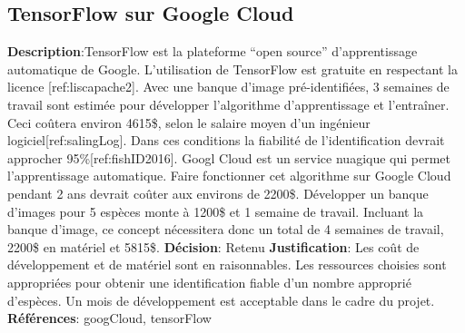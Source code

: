 

\subsection{TensorFlow sur Google Cloud}
\label{s:identifier_conc1}

\textbf{Description}:TensorFlow est la plateforme “open source” d'apprentissage automatique de Google. L’utilisation de TensorFlow est gratuite en respectant la licence [ref:liscapache2]. Avec une banque d’image pré-identifiées, 3 semaines de travail sont estimée pour développer l'algorithme d’apprentissage et l’entraîner. Ceci coûtera environ 4615\$, selon le salaire moyen d’un ingénieur logiciel[ref:salingLog]. Dans ces conditions la fiabilité de l’identification devrait approcher 95\%[ref:fishID2016]. Googl Cloud est un service nuagique qui permet l’apprentissage automatique. Faire fonctionner cet algorithme sur Google Cloud pendant 2 ans devrait coûter aux environs de 2200\$. Développer un banque d’images pour 5 espèces monte à 1200\$ et 1 semaine de travail. Incluant la banque d’image, ce concept nécessitera donc un total de 4 semaines de travail, 2200\$ en matériel et 5815\$.
\textbf{Décision}: Retenu
\textbf{Justification}: Les coût de développement et de matériel sont en raisonnables. Les ressources choisies sont appropriées pour obtenir une identification fiable d’un nombre approprié d’espèces. Un mois de développement est acceptable dans le cadre du projet.
\textbf{Références}: googCloud, tensorFlow